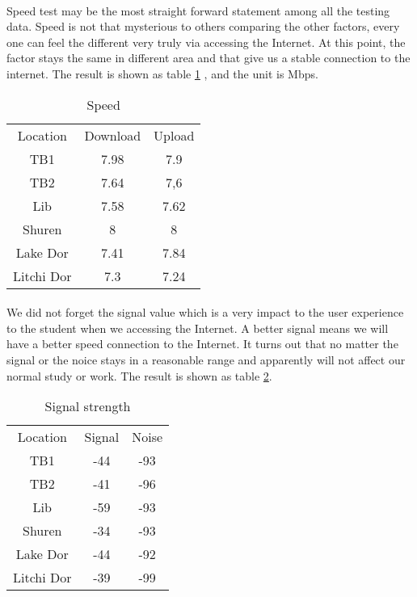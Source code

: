 \documentclass[paper=a4, fontsize=11pt]{scrartcl}
\numberwithin{equation}{section}
\numberwithin{figure}{section}
\numberwithin{table}{section}
\begin{document}
\paragraph{}
Speed test may be the most straight forward statement among all the testing data. Speed is not that mysterious to others comparing the other factors, every one can feel the different very truly via accessing the Internet. At this point, the factor stays the same in different area and that give us a stable connection to the internet. The result is shown as table \ref{tab:c7} , and the unit is Mbps. 
\begin{table}[htbp]
  \centering
  \caption{Speed}
    \begin{tabular}{ccc}
    Location  & Download & Upload \\
    TB1   & 7.98  & 7.9 \\
    TB2   & 7.64  & 7,6 \\
    Lib   & 7.58  & 7.62 \\
    Shuren & 8     & 8 \\
    Lake Dor & 7.41  & 7.84 \\
    Litchi Dor  & 7.3   & 7.24 \\
    \end{tabular}%
  \label{tab:c7}%
\end{table}%
\paragraph{}
We did not forget the signal value which is a very impact to the user experience to the student when we accessing the Internet. A better signal means we will have a better speed connection to the Internet. It turns out that no matter the signal or the noice stays in a reasonable range and apparently will not affect our normal study or work. The result is shown as table \ref{tab:c8}.
\begin{table}[htbp]
  \centering
  \caption{Signal strength}
    \begin{tabular}{ccc}
       Location   & Signal & Noise \\
    TB1   & -44   & -93 \\
    TB2   & -41   & -96 \\
    Lib   & -59   & -93 \\
    Shuren & -34   & -93 \\
    Lake Dor & -44   & -92 \\
    Litchi Dor  & -39   & -99 \\
    \end{tabular}%
  \label{tab:c8}%
\end{table}%
\end{document}
